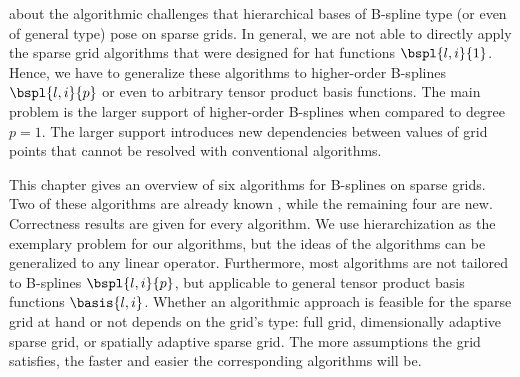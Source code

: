 
\label{chap:40algorithms}


about the algorithmic challenges
that hierarchical bases of B-spline type (or even of general type) pose
on sparse grids.
In general, we are not able to directly apply the sparse grid algorithms
that were designed for hat functions $\bspl{l,i}{1}$.
Hence, we have to generalize these algorithms
to higher-order B-splines $\bspl{l,i}{p}$
or even to arbitrary tensor product basis functions.
The main problem is the larger support
of higher-order B-splines when compared to degree $p = 1$.
The larger support introduces new dependencies between
values of grid points that cannot be resolved with conventional algorithms.

This chapter gives an overview of six algorithms for B-splines
on sparse grids.
Two of these algorithms are already known
,
while the remaining four are new.
Correctness results are given for every algorithm.
We use hierarchization as the exemplary problem for our algorithms,
but the ideas of the algorithms can be generalized to any linear operator.
Furthermore, most algorithms are not tailored to B-splines $\bspl{l,i}{p}$,
but applicable to general tensor product basis functions $\basis{l,i}$.
Whether an algorithmic approach is feasible for the sparse grid at hand
or not depends on the grid's type:
full grid, dimensionally adaptive sparse grid, or
spatially adaptive sparse grid.
The more assumptions the grid satisfies, the faster and
easier the corresponding algorithms will be.

